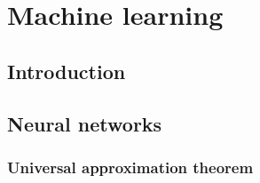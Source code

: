 \chapter{Machine learning}
\label{chap:ml}

\section{Introduction}

\section{Neural networks}
\subsection{Universal approximation theorem}